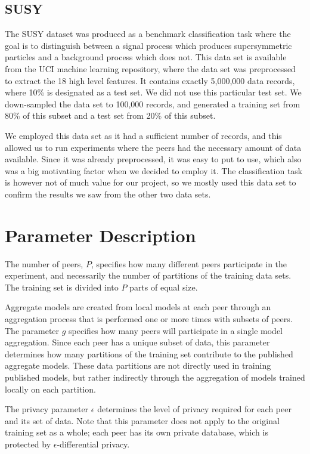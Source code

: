 \subsection{SUSY}
The SUSY dataset \citep{susy2014data} was produced as a benchmark classification task where the goal is to distinguish between a signal process which produces supersymmetric particles and a background process which does not. This data set is available from the UCI machine learning repository, where the data set was preprocessed to extract the 18 high level features. It contains exactly 5,000,000 data records, where 10\% is designated as a test set. We did not use this particular test set. We down-sampled the data set to 100,000 records, and generated a training set from 80\% of this subset and a test set from 20\% of this subset.

We employed this data set as it had a sufficient number of records, and this allowed us to run experiments where the peers had the necessary amount of data available. Since it was already preprocessed, it was easy to put to use, which also was a big motivating factor when we decided to employ it. The classification task is however not of much value for our project, so we mostly used this data set to confirm the results we saw from the other two data sets.     

\section{Parameter Description}

\label{sec:parameter_tuning}
The number of peers, $P$, specifies how many different peers participate in the experiment, and necessarily the number of partitions of the training data sets. The training set is divided into $P$ parts of equal size.

Aggregate models are created from local models at each peer through an aggregation process that is performed one or more times with subsets of peers. The parameter $g$ specifies how many peers will participate in a single model aggregation. Since each peer has a unique subset of data, this parameter determines how many partitions of the training set contribute to the published aggregate models. These data partitions are not directly used in training published models, but rather indirectly through the aggregation of models trained locally on each partition.

The privacy parameter $\epsilon$ determines the level of privacy required for each peer and its set of data. Note that this parameter does not apply to the original training set as a whole; each peer has its own private database, which is protected by $\epsilon$-differential privacy. 

